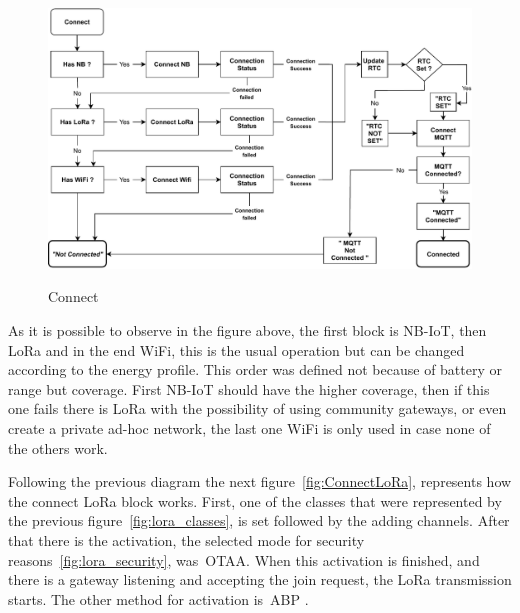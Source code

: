 \begin{figure}[htbp]
  \centering
  
    {\includegraphics[width=\linewidth]{Chapters/Figures/Connect.pdf}}%
 
  \caption{Connect}
  \label{fig:Connect}
\end{figure}

As it is possible to observe in the figure above, the first block is NB-IoT, then LoRa and in the end WiFi, this is the usual operation but can be changed according to the energy profile. This order was defined not because of battery or range but coverage. First NB-IoT should have the higher coverage, then if this one fails there is  LoRa with the possibility of using community gateways, or even create a private ad-hoc network, the last one WiFi is only used in case none of the others work.



Following the previous diagram the next figure~\ref{fig:ConnectLoRa}, represents how the connect LoRa block works. First, one of the classes that were represented by the previous figure~\ref{fig:lora_classes}, is set followed by the adding channels. After that there is the activation, the selected mode for security reasons~\ref{fig:lora_security}, was~\gls{OTAA}. When this activation is finished, and there is a gateway listening and accepting the join request, the LoRa transmission starts. The other method for activation is~\gls{ABP} .

